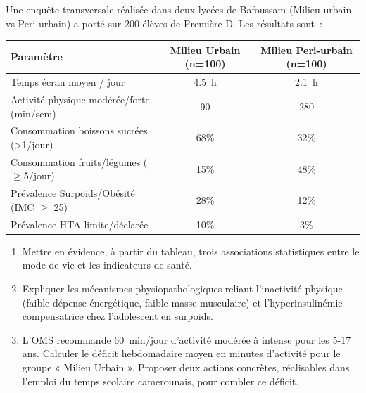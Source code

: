 \documentclass[11pt]{article}
\begin{document}
\begin{exercice}
Une enquête transversale réalisée dans deux lycées de Bafoussam (Milieu urbain vs Peri-urbain) a porté sur 200 élèves de Première D. Les résultats sont~:
\begin{center}
\begin{tabular}{|l|c|c|}
\hline
\textbf{Paramètre} & \textbf{Milieu Urbain (n=100)} & \textbf{Milieu Peri-urbain (n=100)} \\
\hline
Temps écran moyen / jour & \SI{4,5}{h} & \SI{2,1}{h} \\
Activité physique modérée/forte (min/sem) & 90 & 280 \\
Consommation boissons sucrées (>1/jour) & 68\% & 32\% \\
Consommation fruits/légumes ($\ge$5/jour) & 15\% & 48\% \\
Prévalence Surpoids/Obésité (IMC $\ge$ 25) & 28\% & 12\% \\
Prévalence HTA limite/déclarée & 10\% & 3\% \\
\hline
\end{tabular}
\end{center}
\begin{enumerate}
    \item Mettre en évidence, à partir du tableau, trois associations statistiques entre le mode de vie et les indicateurs de santé.
    \item Expliquer les mécanismes physiopathologiques reliant l'inactivité physique (faible dépense énergétique, faible masse musculaire) et l'hyperinsulinémie compensatrice chez l'adolescent en surpoids.
    \item L'OMS recommande \SI{60}{min}/jour d'activité modérée à intense pour les 5-17 ans. Calculer le déficit hebdomadaire moyen en minutes d'activité pour le groupe « Milieu Urbain ». Proposer deux actions concrètes, réalisables dans l'emploi du temps scolaire camerounais, pour combler ce déficit.
\end{enumerate}
\end{exercice}
\end{document}
